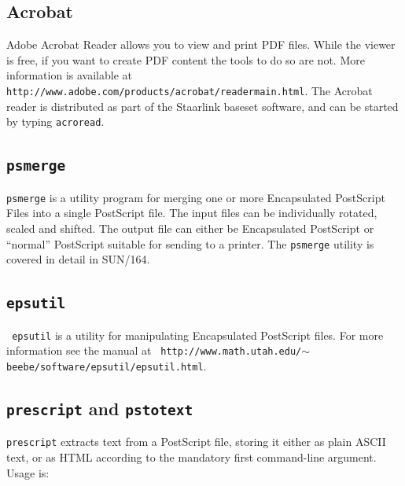 \documentclass[twoside,11pt]{article}
\newcommand{\htmladdnormallink}[2]{#1}
\newcommand{\xref}[3]{#1}
\newcommand{\xlabel}[1]{}
\begin{document}
\subsection{\xlabel{sc15_acrobat}Acrobat\label{sc15_acrobat}}

Adobe \htmladdnormallink{Acrobat
Reader}{http://www.adobe.com/products/acrobat/readstep.html} allows
you to view and print PDF files. While the viewer is free, if you want
to create PDF content the tools to do so are not. More information is
available at \htmladdnormallink{{\tt
http://www.adobe.com/products/acrobat/readermain.html}}{http://www.adobe.com/products/acrobat/readermain.html}.
The Acrobat reader is distributed as part of the Staarlink baseset
software, and can be started by typing {\tt acroread}.

\subsection{\xlabel{sc15_psmerge}{\tt psmerge}\label{sc15_psmerge}}

\xref{{\tt psmerge}}{sun164}{} is a utility program for merging one or
more Encapsulated PostScript Files into a single PostScript file. The
input files can be individually rotated, scaled and shifted. The
output file can either be Encapsulated PostScript or ``normal''
PostScript suitable for sending to a printer. The {\tt psmerge}
utility is covered in detail in \xref{SUN/164}{sun164}{}.

\subsection{{\tt epsutil}}

\htmladdnormallink{{\tt
epsutil}}{http://www.math.utah.edu/~beebe/software/epsutil/epsutil.html}
is a utility for manipulating Encapsulated PostScript files. For more
information see the manual at \htmladdnormallink{{\tt
http://www.math.utah.edu/$\sim$beebe/software/epsutil/epsutil.html}}{http://www.math.utah.edu/~beebe/software/epsutil/epsutil.html}.

\subsection{{\tt prescript} and {\tt pstotext}}

{\tt prescript} extracts text from a PostScript file, storing it
either as plain ASCII text, or as HTML according to the mandatory
first command-line argument. Usage is:
\end{document}
